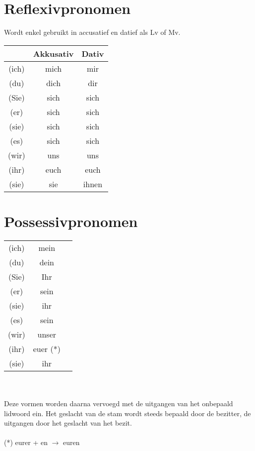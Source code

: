 \documentclass[main.tex]{subfiles}
\begin{document}
\section{Reflexivpronomen}
Wordt enkel gebruikt in accusatief en datief als Lv of Mv.\\
\begin{tabular}{|c|c|c|}
\rowcolor{gray}
\setlength\extrarowheight{8pt}
& Akkusativ & Dativ \\
\hline 
(ich) & mich & mir \\ 
(du) & dich & dir \\ 
(Sie) & sich & sich \\ 
(er) & sich & sich \\ 
(sie) & sich & sich \\ 
(es) & sich & sich \\ 
(wir) & uns & uns \\ 
(ihr) & euch & euch \\ 
(sie) & sie & ihnen \\ 
\hline
\end{tabular} 

\section{Possessivpronomen}
\begin{tabular}{|c|c|c|}
\rowcolor{gray}
(ich) & mein \\ 
(du) & dein \\ 
(Sie) & Ihr \\ 
(er) & sein \\ 
(sie) & ihr \\ 
(es) & sein \\ 
(wir) & unser \\ 
(ihr) & euer (*) \\ 
(sie) & ihr \\ 
\hline
\end{tabular} \\
\\
Deze vormen worden daarna vervoegd met de uitgangen van het onbepaald lidwoord ein.
Het geslacht van de stam wordt steeds bepaald door de bezitter, de uitgangen door het geslacht van het bezit.
\\
\\
(*) eurer + en $\rightarrow$ euren
\end{document}
